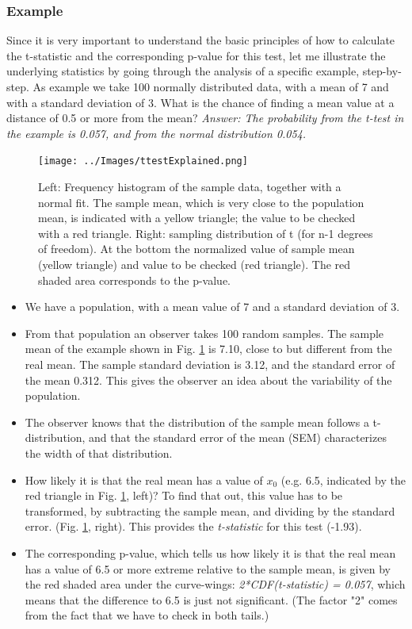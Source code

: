 \subsubsection{Example}

Since it is very important to understand the basic principles of how to calculate the t-statistic and the corresponding p-value for this test, let me illustrate the underlying statistics by going through the analysis of a specific example, step-by-step. As example we take 100 normally distributed data, with a mean of 7 and with a standard deviation of 3.
What is the chance of finding a mean value at a distance of 0.5 or more from the mean? \emph{Answer: The probability from the t-test in the example is 0.057, and from the normal distribution 0.054.}


\begin{figure}
  \centering
  \texttt{[image: ../Images/ttestExplained.png]}\\
  \caption{Left: Frequency histogram of the sample data, together with a normal fit. The sample mean, which is very close to the population mean, is indicated with a yellow triangle; the value to be checked with a red triangle. Right: sampling distribution of t (for n-1 degrees of freedom). At the bottom the normalized value of sample mean (yellow triangle) and value to be checked (red triangle). The red shaded area corresponds to the p-value.}\label{fig:ttestExplained}
\end{figure}

\begin{itemize}
  \item We have a population, with a mean value of 7 and a standard deviation of 3.
  \item From that population an observer takes 100 random samples. The sample mean of the example shown in Fig. \ref{fig:ttestExplained} is 7.10, close to but different from the real mean. The sample standard deviation is 3.12, and the standard error of the mean 0.312. This gives the observer an idea about the variability of the population.
  \item The observer knows that the distribution of the sample mean follows a t-distribution, and that the standard error of the mean (SEM) characterizes the width of that distribution.
  \item How likely it is that the real mean has a value of $x_0$ (e.g. 6.5, indicated by the red triangle in Fig. \ref{fig:ttestExplained}, left)? To find that out, this value has to be transformed, by subtracting the sample mean, and dividing by the standard error. (Fig. \ref{fig:ttestExplained}, right). This provides the \emph{t-statistic} for this test (-1.93).
  \item The corresponding p-value, which tells us how likely it is that the real mean has a value of 6.5 or more extreme relative to the sample mean, is given by the red shaded area under the curve-wings: \emph{2*CDF(t-statistic) = 0.057}, which means that the difference to 6.5 is just not significant. (The factor "2" comes from the fact that we have to check in both tails.)
\end{itemize}

